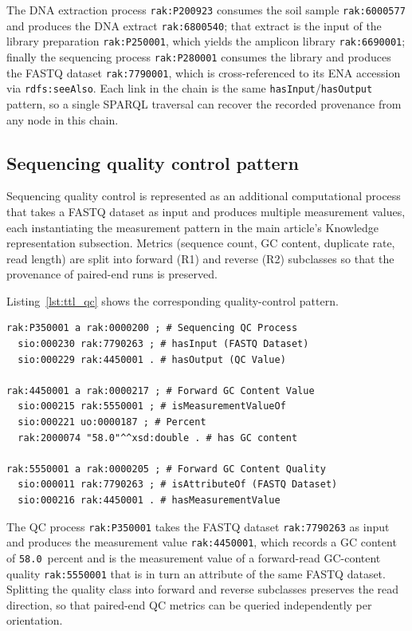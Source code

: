The DNA extraction process
\texttt{rak:P200923} consumes the soil sample
\texttt{rak:6000577} and produces the DNA extract
\texttt{rak:6800540}; that extract is the input of the library
preparation \texttt{rak:P250001}, which yields the amplicon
library \texttt{rak:6690001}; finally the sequencing process
\texttt{rak:P280001} consumes the library and produces the FASTQ
dataset \texttt{rak:7790001}, which is cross-referenced to its
ENA accession via \texttt{rdfs:seeAlso}. Each link in the chain is
the same \texttt{hasInput}/\texttt{hasOutput} pattern, so a single
SPARQL traversal can recover the recorded provenance from any node in this
chain.

\subsection{Sequencing quality control pattern}

Sequencing quality control is represented as an additional
computational process that takes a FASTQ dataset as input and
produces multiple measurement values, each instantiating the
measurement pattern in the main article's Knowledge representation subsection.
Metrics (sequence count, GC content, duplicate rate, read length)
are split into forward (R1) and reverse (R2) subclasses so that the
provenance of paired-end runs is preserved.



Listing~\ref{lst:ttl_qc} shows the corresponding quality-control pattern.

\begin{lstlisting}[caption={Turtle representation of forward-read GC content for ENA run ERR16062319.}, label={lst:ttl_qc}, basicstyle=\ttfamily\scriptsize, frame=single]
rak:P350001 a rak:0000200 ; # Sequencing QC Process
  sio:000230 rak:7790263 ; # hasInput (FASTQ Dataset)
  sio:000229 rak:4450001 . # hasOutput (QC Value)

rak:4450001 a rak:0000217 ; # Forward GC Content Value
  sio:000215 rak:5550001 ; # isMeasurementValueOf
  sio:000221 uo:0000187 ; # Percent
  rak:2000074 "58.0"^^xsd:double . # has GC content

rak:5550001 a rak:0000205 ; # Forward GC Content Quality
  sio:000011 rak:7790263 ; # isAttributeOf (FASTQ Dataset)
  sio:000216 rak:4450001 . # hasMeasurementValue
\end{lstlisting}

The QC process \texttt{rak:P350001} takes the FASTQ
dataset \texttt{rak:7790263} as input and produces the
measurement value \texttt{rak:4450001}, which records a GC
content of \texttt{58.0}~percent and is the measurement value of a
forward-read GC-content quality \texttt{rak:5550001} that is in turn an
attribute of the same FASTQ dataset. Splitting the quality class into
forward and reverse subclasses preserves the read direction, so that
paired-end QC metrics can be queried independently per orientation.
